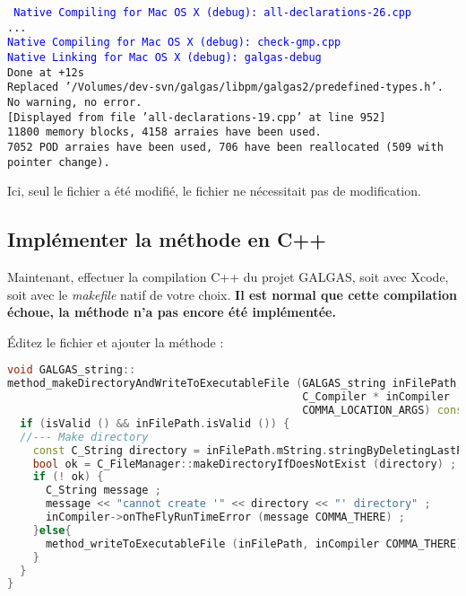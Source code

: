 \begin{mdframed}[hidealllines=true,backgroundcolor=gray!10] \tt\small
\textcolor{blue}{Native Compiling for Mac OS X (debug): all-declarations-26.cpp}\\
...\\
\textcolor{blue}{Native Compiling for Mac OS X (debug): check-gmp.cpp}\\
\textcolor{blue}{Native Linking for Mac OS X (debug): galgas-debug}\\
Done at +12s\\
\textcolor{OliveGreen}{Replaced '/Volumes/dev-svn/galgas/libpm/galgas2/predefined-types.h'.}\\
No warning, no error.\\
\verb![!Displayed from file 'all-declarations-19.cpp' at line 952\verb!]!\\
11800 memory blocks, 4158 arraies have been used.\\
7052 POD arraies have been used, 706 have been reallocated (509 with pointer change).
\end{mdframed}

Ici, seul le fichier  a été modifié, le fichier  ne nécessitait pas de modification.



\subsection{Implémenter la méthode en C++}

Maintenant, effectuer la compilation C++ du projet GALGAS, soit avec Xcode, soit avec le \emph{makefile} natif de votre choix. {\bf Il est normal 
que cette compilation échoue, la méthode n'a pas encore été implémentée.}

Éditez le fichier  et ajouter la méthode :

\begin{lstlisting}[language=C++]
void GALGAS_string::
method_makeDirectoryAndWriteToExecutableFile (GALGAS_string inFilePath,
                                              C_Compiler * inCompiler
                                              COMMA_LOCATION_ARGS) const {
  if (isValid () && inFilePath.isValid ()) {
  //--- Make directory
    const C_String directory = inFilePath.mString.stringByDeletingLastPathComponent () ;
    bool ok = C_FileManager::makeDirectoryIfDoesNotExist (directory) ;
    if (! ok) {
      C_String message ;
      message << "cannot create '" << directory << "' directory" ;
      inCompiler->onTheFlyRunTimeError (message COMMA_THERE) ;
    }else{
      method_writeToExecutableFile (inFilePath, inCompiler COMMA_THERE) ;
    }
  }
}
\end{lstlisting}

